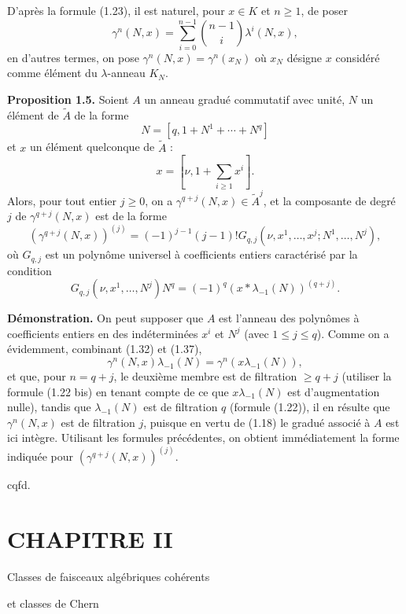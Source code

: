 \documentclass[11pt]{article}
\begin{document}
D'après la formule (1.23), il est naturel, pour $x\in K$ et $n\geq1$, de poser
\begin{equation}\tag{1.37}
\gamma^n(N,x)=\sum_{i=0}^{n-1}\binom{n-1}{i}\lambda^i(N,x),
\end{equation}
en d'autres termes, on pose $\gamma^n(N,x)=\gamma^n(x_N)$ où $x_N$ désigne $x$ considéré comme élément du $\lambda$-anneau $K_N$.

\textbf{Proposition 1.5.} Soient $A$ un anneau gradué commutatif avec unité, $N$ un élément de $\widetilde A$ de la forme
\[
N=[q,1+N^1+\cdots+N^q]
\]
et $x$ un élément quelconque de $\widetilde A$ :
\[
x=[\nu,1+\sum_{i\geq1}x^i].
\]
Alors, pour tout entier $j\geq0$, on a $\gamma^{q+j}(N,x)\in\widetilde A^j$, et la composante de degré $j$ de $\gamma^{q+j}(N,x)$ est de la forme
\begin{equation}\tag{1.38}
\left(\gamma^{q+j}(N,x)\right)^{(j)}=(-1)^{j-1}(j-1)!G_{q,j}(\nu,x^1,\ldots,x^j;N^1,\ldots,N^j),
\end{equation}
où $G_{q,j}$ est un polynôme universel à coefficients entiers caractérisé par la condition
\begin{equation}\tag{1.39}
G_{q,j}(\nu,x^1,\ldots,N^j)N^q=(-1)^q(x*\lambda_{-1}(N))^{(q+j)}.
\end{equation}

\textbf{Démonstration.} On peut supposer que $A$ est l'anneau des polynômes à coefficients entiers en des indéterminées $x^i$ et $N^j$ (avec $1\leq j\leq q$). Comme on a évidemment, combinant (1.32) et (1.37),
\begin{equation}\tag{1.40}
\gamma^n(N,x)\lambda_{-1}(N)=\gamma^n(x\lambda_{-1}(N)),
\end{equation}
et que, pour $n=q+j$, le deuxième membre est de filtration $\geq q+j$ (utiliser la formule (1.22 bis) en tenant compte de ce que $x\lambda_{-1}(N)$ est d'augmentation nulle), tandis que $\lambda_{-1}(N)$ est de filtration $q$ (formule (1.22)), il en résulte que $\gamma^n(N,x)$ est de filtration $j$, puisque en vertu de (1.18) le gradué associé à $A$ est ici intègre. Utilisant les formules précédentes, on obtient immédiatement la forme indiquée pour $(\gamma^{q+j}(N,x))^{(j)}$.
\begin{flushright}cqfd.\end{flushright}

\section*{CHAPITRE II}
\begin{center}
Classes de faisceaux algébriques cohérents\par
et classes de Chern
\end{center}
\end{document}
